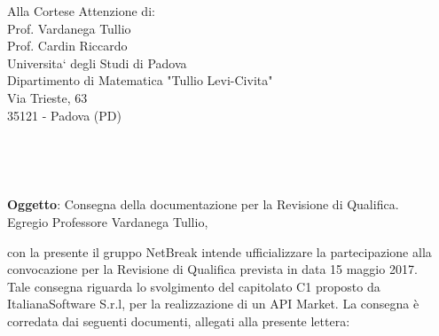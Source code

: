 \documentclass[11pt,a4paper]{letter}
\def\opening#1{\thispagestyle{empty}
{\centering\fromaddress \vspace{0.6in} \\ %
\hspace*{\longindentation}\hspace*{\fill}\par} %
{\raggedright \toname \\ \toaddress \par} %
\vspace{0.1in} %
\noindent #1 %
}
\begin{document}

\begin{letter}
{Alla Cortese Attenzione di:\\
	Prof. Vardanega Tullio\\
	Prof. Cardin Riccardo\\
	Universita` degli Studi di Padova\\
	Dipartimento di Matematica "Tullio Levi-Civita"\\
	Via Trieste, 63\\
	35121 - Padova (PD)\\
}


\opening{\textbf{Oggetto}: Consegna della documentazione per la Revisione di Qualifica.}\\

\noindent Egregio Professore Vardanega Tullio,

\indent con la presente il gruppo NetBreak intende ufficializzare la partecipazione alla convocazione per la Revisione di Qualifica prevista in data 15 maggio 2017. \\ Tale consegna riguarda lo svolgimento del capitolato C1 proposto da ItalianaSoftware S.r.l, per la realizzazione di un API Market.
La consegna \`e corredata dai seguenti documenti, allegati alla presente lettera:



\end{letter}
\end{document}
